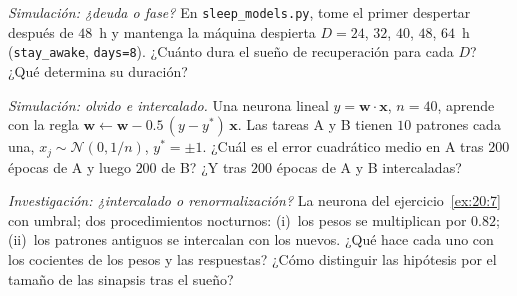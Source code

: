 \begin{exercise}[\lvlB]
\label{ex:20:6}
\emph{Simulación: ¿deuda o fase?} En \texttt{sleep\_models.py}, tome el primer despertar después de $48$~h y mantenga la máquina despierta $D=24$, $32$, $40$, $48$, $64$~h (\texttt{stay\_awake}, \texttt{days=8}). ¿Cuánto dura el sueño de recuperación para cada $D$? ¿Qué determina su duración?
\end{exercise}

\begin{exercise}[\lvlB]
\label{ex:20:7}
\emph{Simulación: olvido e intercalado.} Una neurona lineal $y=\mathbf w\cdot\mathbf x$, $n=40$, aprende con la regla $\mathbf w\leftarrow\mathbf w-0.5\,(y-y^*)\,\mathbf x$. Las tareas A y B tienen $10$ patrones cada una, $x_j\sim\mathcal N(0,1/n)$, $y^*=\pm1$. ¿Cuál es el error cuadrático medio en A tras $200$ épocas de A y luego $200$ de B? ¿Y tras $200$ épocas de A y B intercaladas?
\end{exercise}

\begin{exercise}[\lvlC]
\label{ex:20:8}
\emph{Investigación: ¿intercalado o renormalización?} La neurona del ejercicio~\ref{ex:20:7} con umbral; dos procedimientos nocturnos: (i)~los pesos se multiplican por $0.82$; (ii)~los patrones antiguos se intercalan con los nuevos. ¿Qué hace cada uno con los cocientes de los pesos y las respuestas? ¿Cómo distinguir las hipótesis por el tamaño de las sinapsis tras el sueño?
\end{exercise}
